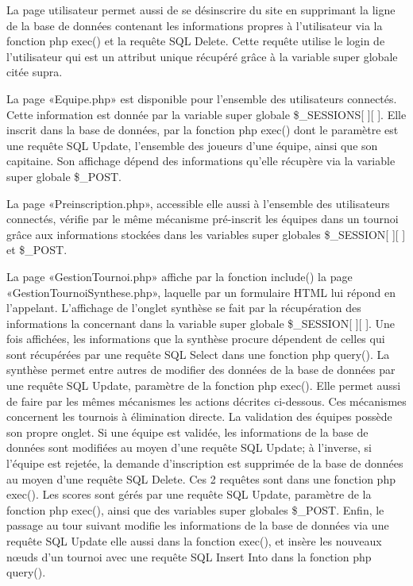 \documentclass[12pt]{report}
\begin{document}
       La page utilisateur permet aussi de se désinscrire du site en supprimant la ligne de la base de données contenant les informations propres à l’utilisateur via la fonction php exec() et la requête SQL Delete. Cette requête utilise le login de l’utilisateur qui est un attribut unique récupéré grâce à la variable super globale citée supra.  
       \bigskip
       \par
	   La page «Equipe.php» est disponible pour l’ensemble des utilisateurs connectés. Cette information est donnée par la variable super globale \$\_SESSIONS[ ][ ]. Elle inscrit dans la base de données, par la fonction php exec() dont le paramètre est une requête SQL Update, l’ensemble des joueurs d’une équipe, ainsi que son capitaine. Son affichage dépend des informations qu’elle récupère via la variable super globale \$\_POST.
       \bigskip
       \par
	   La page «Preinscription.php», accessible elle aussi à l’ensemble des utilisateurs connectés, vérifie par le même mécanisme pré-inscrit les équipes dans un tournoi grâce aux informations stockées dans les variables super globales \$\_SESSION[ ][ ] et \$\_POST.
       \bigskip
       \par
   	   La page «GestionTournoi.php» affiche par la fonction include() la page 
   	   «GestionTournoiSynthese.php», laquelle par un formulaire HTML lui 
   	   répond en l’appelant.
       L’affichage de l’onglet synthèse se fait par la récupération des informations la concernant dans la variable super globale \$\_SESSION[ ][ ]. Une fois affichées, les informations que la synthèse procure dépendent de celles qui sont récupérées par une requête SQL Select dans une fonction php query(). La synthèse permet entre autres de modifier des données de la base de données par une requête SQL Update, paramètre de la fonction php exec(). Elle permet aussi de faire par les mêmes mécanismes les actions décrites ci-dessous. Ces mécanismes concernent les tournois à élimination directe.
       La validation des équipes possède son propre onglet. Si une équipe est validée, les informations de la base de données sont modifiées au moyen d’une requête SQL Update; à l’inverse, si l’équipe est rejetée, la demande d’inscription est supprimée de la base de données au moyen d’une requête SQL Delete. Ces 2 requêtes sont dans une fonction php exec().
       Les scores sont gérés par une requête SQL Update, paramètre de la fonction php exec(), ainsi que des variables super globales \$\_POST.
       Enfin, le passage au tour suivant modifie les informations de la base de données via une requête SQL Update elle aussi dans la fonction exec(), et insère les nouveaux nœuds d’un tournoi avec une requête SQL Insert Into dans la fonction php query().
\end{document}
